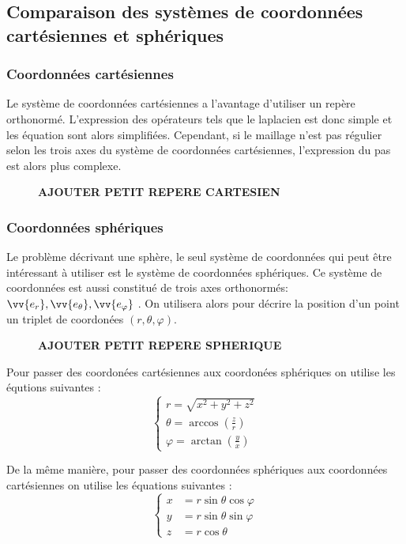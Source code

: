 \documentclass[fleqn]{article}
\renewcommand{\phi}{\varphi}
\begin{document}
\subsection{Comparaison des systèmes de coordonnées cartésiennes et sphériques}
\subsubsection{Coordonnées cartésiennes}
Le système de coordonnées cartésiennes a l'avantage d'utiliser un repère orthonormé. L'expression des opérateurs tels que le laplacien est donc simple et les équation sont alors simplifiées. Cependant, si le maillage n'est pas régulier selon les trois axes du système de coordonnées cartésiennes, l'expression du pas est alors plus complexe.

\begin{figure}[H]
    \centering
    \textbf{AJOUTER PETIT REPERE CARTESIEN}
\end{figure}

\subsubsection{Coordonnées sphériques}
Le problème décrivant une sphère, le seul système de coordonnées qui peut être intéressant à utiliser est le système de coordonnées sphériques. Ce système de coordonnées est aussi constitué de trois axes orthonormés:$\vv{e_r}, \vv{e_\theta}, \vv{e_\phi}$ . On utilisera alors pour décrire la position d'un point un triplet de coordonées $(r, \theta, \phi)$. 

\begin{figure}[H]
    \centering
    \textbf{AJOUTER PETIT REPERE SPHERIQUE}
\end{figure}


Pour passer des coordonées cartésiennes aux coordonées sphériques on utilise les équtions suivantes :
\begin{equation}
    \begin{cases}
        r = \sqrt{x^2 + y^2 + z^2} \\
        \theta = \arccos \left( \frac{z}{r} \right)\\
        \phi = \arctan \left( \frac{y}{x} \right)
    \end{cases}
\end{equation}

De la même manière, pour passer des coordonnées sphériques aux coordonnées cartésiennes on utilise les équations suivantes :
\begin{equation}
    \begin{cases}
        x&=r \sin \theta \cos \varphi \\
        y&=r \sin \theta \sin \varphi \\
        z&=r \cos \theta 
    \end{cases}
    \label{Polar coord}
\end{equation}
\end{document}
